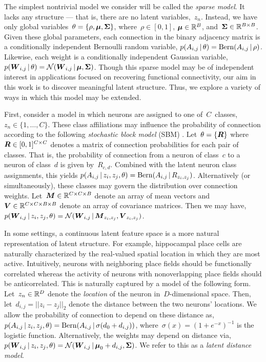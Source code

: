 The simplest nontrivial model we consider will be called the \emph{sparse model}.
It lacks any structure --- that is, there are no latent variables,~$z_n$. 
Instead, we have only global variables~$\theta = \{\rho, \boldsymbol{\mu}, \boldsymbol{\Sigma} \}$, where~${\rho \in [0,1]}$, ${\boldsymbol{\mu} \in \mathbb{R}^B}$, and~${\boldsymbol{\Sigma} \in \mathbb{R}^{B \times B}}$. 
Given these global parameters, each connection in the binary adjacency matrix is a conditionally independent Bernoulli random variable,
${p(A_{i,j} \,|\, \theta) = \mathrm{Bern}(A_{i,j} \,|\, \rho)}$.
Likewise, each weight is a conditionally independent Gaussian variable,
${p(\boldsymbol{W}_{i,j} \,|\, \theta) = \mathcal{N}(\boldsymbol{W}_{i,j} \,|\, \boldsymbol{\mu}, \boldsymbol{\Sigma})}$.
Though this sparse model may be of independent interest in applications focused on recovering functional connectivity, our aim in this work is to discover meaningful latent structure. 
Thus, we explore a variety of ways in which this model may be extended.

First, consider a model in which neurons are assigned to one of~$C$~classes,~$z_n \in \{1, \ldots, C\}$. 
These class affiliations may influence the probability of connection according to the following \emph{stochastic block model} (SBM) \cite{Nowicki-2001}. 
Let~$\theta = \{\boldsymbol{R}\}$ where~${\boldsymbol{R} \in [0,1]^{C \times C}}$ denotes a matrix of connection probabilities for each pair of classes. 
That is, the probability of connection from a neuron of class~$c$ to a neuron of class~$d$ is given by~$R_{c,d}$.
Combined with the latent neuron class assignments, this yields
${p(A_{i,j} \,|\, z_i, z_j, \theta) = \mathrm{Bern}(A_{i,j} \,|\, R_{z_i, z_j})}$.
Alternatively (or simultaneously), these classes may govern the distribution over connection weights. 
Let~${\boldsymbol{M} \in \mathbb{R}^{C \times C \times B}}$ denote an array of mean vectors and~
${\boldsymbol{V} \in \mathbb{R}^{C \times C \times B \times B}}$ denote an array of covariance matrices. 
Then we may have,
${p(\boldsymbol{W}_{i,j} \,|\, z_i, z_j, \theta) = \mathcal{N}(\boldsymbol{W}_{i,j} \,|\, \boldsymbol{M}_{z_i, z_j}, \boldsymbol{V}_{z_i,z_j})}$.

In some settings, a continuous latent feature space is a more natural representation of latent structure. 
For example, hippocampal place cells are naturally characterized by the real-valued spatial location in which they are most active. 
Intuitively, neurons with neighboring place fields should be functionally correlated whereas the activity of neurons with nonoverlapping place fields should be anticorrelated.
This is naturally captured by a model of the following form.
Let~$z_n \in \mathbb{R}^D$ denote the \emph{location} of the neuron in~$D$-dimensional space. 
Then, let~${d_{i,j} = ||z_i - z_j||_2}$ denote the distance between the two neurons' locations.
We allow the probability of connection to depend on these distance as,
${p(A_{i,j} \,|\, z_i, z_j, \theta) = \mathrm{Bern}(A_{i,j} \,|\, \sigma(d_0 + d_{i,j}))}$,
where~${\sigma(x)=(1+e^{-x})^{-1}}$ is the logistic function.
Alternatively, the weights may depend on distance via,
${p(\boldsymbol{W}_{i,j} \,|\, z_i, z_j, \theta) = \mathcal{N}(\boldsymbol{W}_{i,j} \,|\, \boldsymbol{\mu}_0 + d_{i,j}, \boldsymbol{\Sigma})}$.
We refer to this as a \emph{latent distance model}.



